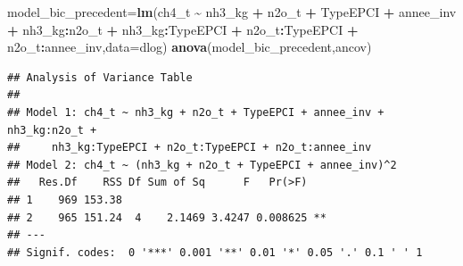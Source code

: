 \documentclass[
]{article}
\newenvironment{Shaded}{\begin{snugshade}}{\end{snugshade}}
\newcommand{\AttributeTok}[1]{\textcolor[rgb]{0.13,0.29,0.53}{#1}}
\newcommand{\DecValTok}[1]{\textcolor[rgb]{0.00,0.00,0.81}{#1}}
\newcommand{\FunctionTok}[1]{\textcolor[rgb]{0.13,0.29,0.53}{\textbf{#1}}}
\newcommand{\NormalTok}[1]{#1}
\newcommand{\OtherTok}[1]{\textcolor[rgb]{0.56,0.35,0.01}{#1}}
\newcommand{\SpecialCharTok}[1]{\textcolor[rgb]{0.81,0.36,0.00}{\textbf{#1}}}
\newcommand{\StringTok}[1]{\textcolor[rgb]{0.31,0.60,0.02}{#1}}
\begin{document}
\begin{Shaded}
\begin{Highlighting}[]
\NormalTok{model\_bic\_precedent}\OtherTok{=}\FunctionTok{lm}\NormalTok{(ch4\_t }\SpecialCharTok{\textasciitilde{}}\NormalTok{ nh3\_kg }\SpecialCharTok{+}\NormalTok{ n2o\_t }\SpecialCharTok{+}\NormalTok{ TypeEPCI }\SpecialCharTok{+}\NormalTok{ annee\_inv }\SpecialCharTok{+}\NormalTok{ nh3\_kg}\SpecialCharTok{:}\NormalTok{n2o\_t }\SpecialCharTok{+} 
\NormalTok{    nh3\_kg}\SpecialCharTok{:}\NormalTok{TypeEPCI }\SpecialCharTok{+}\NormalTok{ n2o\_t}\SpecialCharTok{:}\NormalTok{TypeEPCI }\SpecialCharTok{+}\NormalTok{ n2o\_t}\SpecialCharTok{:}\NormalTok{annee\_inv,}\AttributeTok{data=}\NormalTok{dlog)}
\FunctionTok{anova}\NormalTok{(model\_bic\_precedent,ancov)}
\end{Highlighting}
\end{Shaded}

\begin{verbatim}
## Analysis of Variance Table
## 
## Model 1: ch4_t ~ nh3_kg + n2o_t + TypeEPCI + annee_inv + nh3_kg:n2o_t + 
##     nh3_kg:TypeEPCI + n2o_t:TypeEPCI + n2o_t:annee_inv
## Model 2: ch4_t ~ (nh3_kg + n2o_t + TypeEPCI + annee_inv)^2
##   Res.Df    RSS Df Sum of Sq      F   Pr(>F)   
## 1    969 153.38                                
## 2    965 151.24  4    2.1469 3.4247 0.008625 **
## ---
## Signif. codes:  0 '***' 0.001 '**' 0.01 '*' 0.05 '.' 0.1 ' ' 1
\end{verbatim}

\begin{Shaded}
\end{Shaded}
\end{document}
